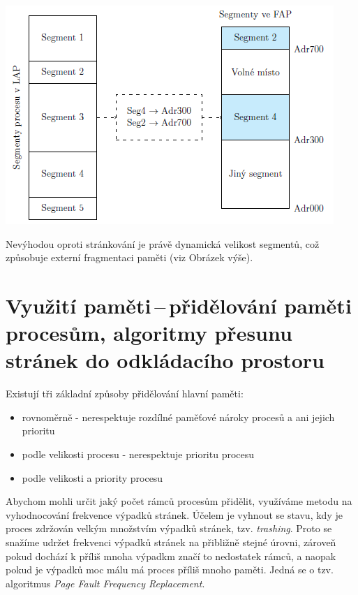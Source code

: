 \begin{center}
    \includegraphics[scale=1]{images/mem_segment_table.png} \label{mem:segment-table}
\end{center}

Nevýhodou oproti stránkování je právě dynamická velikost segmentů, což způsobuje externí fragmentaci paměti (viz Obrázek výše).


\newpage
\section{Využití paměti\,--\,přidělování paměti procesům, algoritmy přesunu stránek do odkládacího prostoru}

Existují tři základní způsoby přidělování hlavní paměti:
\begin{itemize}
    \item rovnoměrně - nerespektuje rozdílné paměťové nároky procesů a ani jejich prioritu
    \item podle velikosti procesu - nerespektuje prioritu procesu
    \item podle velikosti a priority procesu
\end{itemize}

Abychom mohli určit jaký počet rámců procesům přidělit, využíváme metodu na vyhodnocování frekvence výpadků stránek. Účelem je vyhnout se stavu, kdy je proces zdržován velkým množstvím výpadků stránek, tzv. \textit{trashing}. Proto se snažíme udržet frekvenci výpadků stránek na přibližně stejné úrovni, zároveň pokud dochází k příliš mnoha výpadkm značí to nedostatek rámců, a naopak pokud je výpadků moc málu má proces příliš mnoho paměti. Jedná se o tzv. algoritmus \textit{Page Fault Frequency Replacement}. 

